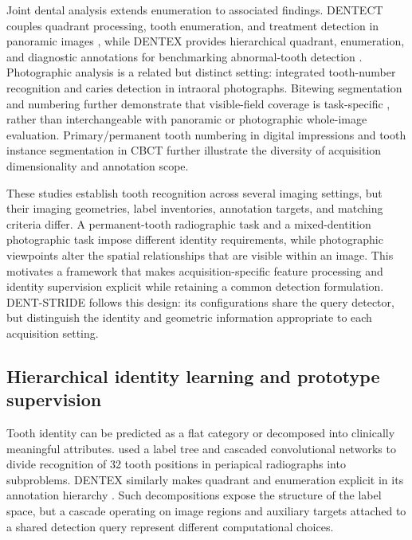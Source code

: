 \documentclass[a4paper,fleqn]{cas-dc}
\begin{document}
Joint dental analysis extends enumeration to associated findings. DENTECT couples quadrant processing, tooth enumeration, and treatment detection in panoramic images \citep{yuksel2021dentect}, while DENTEX provides hierarchical quadrant, enumeration, and diagnostic annotations for benchmarking abnormal-tooth detection \citep{hamamci2023dentex}. Photographic analysis is a related but distinct setting: \citet{yoon2024caries} integrated tooth-number recognition and caries detection in intraoral photographs. Bitewing segmentation and numbering further demonstrate that visible-field coverage is task-specific \citep{tekin2022bitewing}, rather than interchangeable with panoramic or photographic whole-image evaluation. Primary/permanent tooth numbering in digital impressions \citep{vannistelrooij2025teeth} and tooth instance segmentation in CBCT \citep{zhou2025oralseg} further illustrate the diversity of acquisition dimensionality and annotation scope.

These studies establish tooth recognition across several imaging settings, but their imaging geometries, label inventories, annotation targets, and matching criteria differ. A permanent-tooth radiographic task and a mixed-dentition photographic task impose different identity requirements, while photographic viewpoints alter the spatial relationships that are visible within an image. This motivates a framework that makes acquisition-specific feature processing and identity supervision explicit while retaining a common detection formulation. DENT-STRIDE follows this design: its configurations share the query detector, but distinguish the identity and geometric information appropriate to each acquisition setting.

\subsection{Hierarchical identity learning and prototype supervision}

Tooth identity can be predicted as a flat category or decomposed into clinically meaningful attributes. \citet{zhang2018labeltree} used a label tree and cascaded convolutional networks to divide recognition of 32 tooth positions in periapical radiographs into subproblems. DENTEX similarly makes quadrant and enumeration explicit in its annotation hierarchy \citep{hamamci2023dentex}. Such decompositions expose the structure of the label space, but a cascade operating on image regions and auxiliary targets attached to a shared detection query represent different computational choices.
\end{document}
